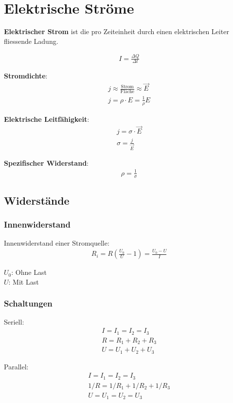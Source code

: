 \section{Elektrische Ströme}

\textbf{Elektrischer Strom} ist die pro Zeiteinheit durch einen elektrischen Leiter
fliessende Ladung.

\begin{align*}
	& I = \frac{\Delta Q}{\Delta t}
\end{align*}

\textbf{Stromdichte}:
\begin{align*}
	& j \approx \frac{\textrm{Strom}}{\textrm{Fläche}} \approx \vec{E} \\
	& j = \rho \cdot E = \frac{1}{\rho}E
\end{align*}

\textbf{Elektrische Leitfähigkeit}:
\begin{align*}
	& j = \sigma \cdot \vec{E} \\
	& \sigma = \frac{j}{\vec{E}}
\end{align*}

\textbf{Spezifischer Widerstand}:
\begin{align*}
	& \rho = \frac{1}{\sigma}
\end{align*}

\subsection{Widerstände}

\subsubsection{Innenwiderstand}

Innenwiderstand einer Stromquelle:
\begin{align*}
	& R_i = R \left(\frac{U_0}{U} - 1\right) = \frac{U_0 - U}{I}
\end{align*}

$U_0$: Ohne Last\\
$U$: Mit Last

\subsubsection{Schaltungen}

\begin{minipage}[t]{.5\linewidth}
	Seriell:
	\begin{align*}
		& I = I_1 = I_2 = I_3 \\
		& R = R_1 + R_2 + R_3 \\
		& U = U_1 + U_2 + U_3
	\end{align*}
	
\end{minipage}
\begin{minipage}[t]{.5\linewidth}
	Parallel:
	\begin{align*}
		& I = I_1 = I_2 = I_3 \\
		& 1/R = 1/R_1 + 1/R_2 + 1/R_3 \\
		& U = U_1 = U_2 = U_3
	\end{align*}
	
\end{minipage}


